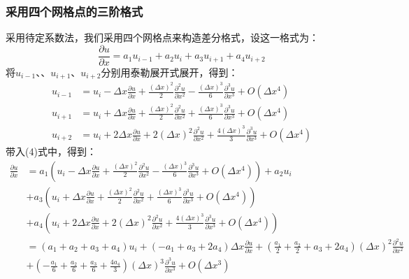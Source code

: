\documentclass[UTF8]{ctexart}
\begin{document}
\subsubsection{采用四个网格点的三阶格式}
采用待定系数法，我们采用四个网格点来构造差分格式，设这一格式为：
\begin{equation}
   \frac{\partial u}{\partial x} = a_1 u_{i-1} + a_2 u_i + a_3 u_{i+1} + a_4 u_{i+2}
\end{equation}
将$u_{i-1}$、、$u_{i+1}$、$u_{i+2}$分别用泰勒展开式展开，得到：
\begin{equation}
    \begin{aligned}
        u_{i-1} &= u_i - \Delta x \frac{\partial u}{\partial x} + \frac{(\Delta x)^2}{2} \frac{\partial^2 u}{\partial x^2} - \frac{(\Delta x)^3}{6} \frac{\partial^3 u}{\partial x^3} + O(\Delta x^4) \\
        u_{i+1} &= u_i + \Delta x \frac{\partial u}{\partial x} + \frac{(\Delta x)^2}{2} \frac{\partial^2 u}{\partial x^2} + \frac{(\Delta x)^3}{6} \frac{\partial^3 u}{\partial x^3} + O(\Delta x^4) \\
        u_{i+2} &= u_i + 2\Delta x \frac{\partial u}{\partial x} + 2(\Delta x)^2 \frac{\partial^2 u}{\partial x^2} + \frac{4(\Delta x)^3}{3} \frac{\partial^3 u}{\partial x^3} + O(\Delta x^4)
    \end{aligned}
\end{equation}
带入(4)式中，得到：
\begin{equation}
    \begin{aligned}
        \frac{\partial u}{\partial x} &= a_1 \left( u_i - \Delta x \frac{\partial u}{\partial x} + \frac{(\Delta x)^2}{2} \frac{\partial^2 u}{\partial x^2} - \frac{(\Delta x)^3}{6} \frac{\partial^3 u}{\partial x^3} + O(\Delta x^4) \right) + a_2 u_i \\
        &+ a_3 \left( u_i + \Delta x \frac{\partial u}{\partial x} + \frac{(\Delta x)^2}{2} \frac{\partial^2 u}{\partial x^2} + \frac{(\Delta x)^3}{6} \frac{\partial^3 u}{\partial x^3} + O(\Delta x^4) \right) \\
        &+ a_4 \left( u_i + 2\Delta x \frac{\partial u}{\partial x} + 2(\Delta x)^2 \frac{\partial^2 u}{\partial x^2} + \frac{4(\Delta x)^3}{3} \frac{\partial^3 u}{\partial x^3} + O(\Delta x^4) \right)\\
        &= (a_1 + a_2 + a_3 + a_4) u_i + \left( -a_1 + a_3 + 2a_4 \right) \Delta x \frac{\partial u}{\partial x} + \left( \frac{a_1}{2} + \frac{a_2}{2} + a_3 + 2a_4 \right) (\Delta x)^2 \frac{\partial^2 u}{\partial x^2} \\
        &+ \left( -\frac{a_1}{6} + \frac{a_2}{6} + \frac{a_3}{6} + \frac{4a_4}{3} \right) (\Delta x)^3 \frac{\partial^3 u}{\partial x^3} + O(\Delta x^3)
    \end{aligned}
\end{equation}
\end{document}
